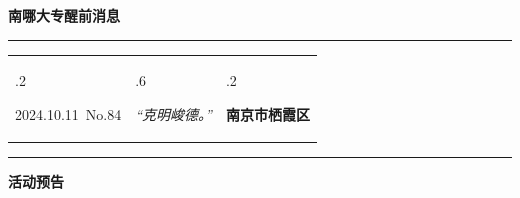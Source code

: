 \documentclass[letterpaper, 12pt]{article}
\begin{document}
\begin{center}
    \Huge\textbf{南哪大专醒前消息}
\end{center}
\vspace{4mm}
\hrule
\renewcommand\tabularxcolumn[1]{m{#1}}
\begin{tabularx}{\textwidth}{>{\hsize.2\hsize}X>{\hsize.6\hsize}X>{\hsize.2\hsize}X}
    \begin{flushleft}
        2024.10.11\, No.84
    \end{flushleft}
    &
    \begin{center}
        \textit{“克明峻德。”}
    \end{center}
    &
    \begin{flushright}
        \textbf{南京市栖霞区}
    \end{flushright}
\end{tabularx}
\vspace{-3.5mm}
\hrule
\vspace{4mm}
\centerline{\huge\textbf{活动预告}}
\end{document}
